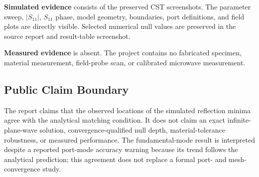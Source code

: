 \textbf{Simulated evidence} consists of the preserved CST screenshots. The parameter
sweep, $|S_{11}|$, $S_{11}$ phase, model geometry, boundaries, port definitions, and
field plots are directly visible. Selected numerical null values are preserved in the
source report and result-table screenshot.

\textbf{Measured evidence} is absent. The project contains no fabricated specimen,
material measurement, field-probe scan, or calibrated microwave measurement.

\subsection{Public Claim Boundary}

The report claims that the observed locations of the simulated reflection minima agree
with the analytical matching condition. It does not claim an exact infinite-plane-wave
solution, convergence-qualified null depth, material-tolerance robustness, or measured
performance. The fundamental-mode result is interpreted despite a reported port-mode
accuracy warning because its trend follows the analytical prediction; this agreement
does not replace a formal port- and mesh-convergence study.
